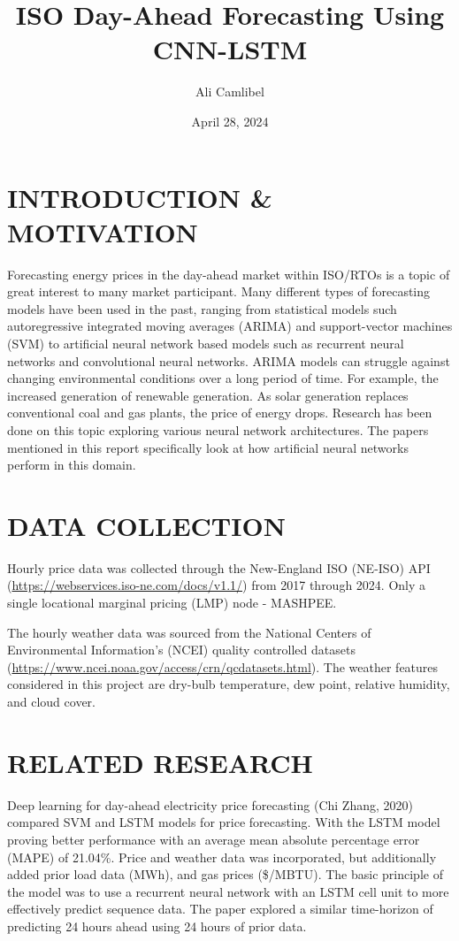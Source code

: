 \documentclass[9pt,a4paper,twoside]{rho}
\title{ISO Day-Ahead Forecasting Using CNN-LSTM}
\author[1]{Ali Camlibel}
\date{April 28, 2024} %
\begin{document}
	
\maketitle
\thispagestyle{firststyle}


\section*{INTRODUCTION \& MOTIVATION}

Forecasting energy prices in the day-ahead market within ISO/RTOs is a topic of great interest to many market participant. Many different types of forecasting models have been used in the past, ranging from statistical models such autoregressive integrated moving averages (ARIMA) and support-vector machines (SVM) to artificial neural network based models such as recurrent neural networks and convolutional neural networks. ARIMA models can struggle against changing environmental conditions over a long period of time. For example, the increased generation of renewable generation. As solar generation replaces conventional coal and gas plants, the price of energy drops. Research has been done on this topic exploring various neural network architectures. The papers mentioned in this report specifically look at how artificial neural networks perform in this domain.

\section*{DATA COLLECTION}

Hourly price data was collected through the New-England ISO (NE-ISO) API (\url{https://webservices.iso-ne.com/docs/v1.1/}) from 2017 through 2024. Only a single locational marginal pricing (LMP) node - MASHPEE. 

\noindent The hourly weather data was sourced from the National Centers of Environmental Information's (NCEI) quality controlled datasets (\url{https://www.ncei.noaa.gov/access/crn/qcdatasets.html}). The weather features considered in this project are dry-bulb temperature, dew point, relative humidity, and cloud cover.

\section*{RELATED RESEARCH}

Deep learning for day-ahead electricity price forecasting (Chi Zhang, 2020) compared SVM and LSTM models for price forecasting. With the LSTM model proving better performance with an average mean absolute percentage error (MAPE) of 21.04\%. Price and weather data was incorporated, but additionally added prior load data (MWh), and gas prices (\$/MBTU). The basic principle of the model was to use a recurrent neural network with an LSTM cell unit to more effectively predict sequence data. The paper explored a similar time-horizon of predicting 24 hours ahead using 24 hours of prior data.
\end{document}
